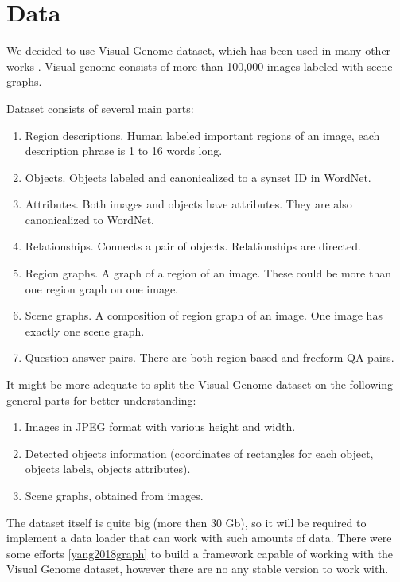 \chapter{Data}

We decided to use Visual Genome dataset, which has been used in many other works \cite{Krishna_Zhu_Groth_Johnson_Hata_Kravitz_Chen_Kalantidis_Li_Shamma_etal_2016}. Visual genome consists of more than 100,000 images labeled with scene graphs.

Dataset consists of several main parts:

\begin{enumerate}
    \item Region descriptions. Human labeled important regions of an image, each description phrase is 1 to 16 words long.
    \item Objects. Objects labeled and canonicalized to a synset ID in WordNet.
    \item Attributes. Both images and objects have attributes. They are also canonicalized to WordNet.
    \item Relationships. Connects a pair of objects. Relationships are directed.
    \item Region graphs. A graph of a region of an image. These could be more than one region graph on one image.
    \item Scene graphs. A composition of region graph of an image. One image has exactly one scene graph.
    \item Question-answer pairs. There are both region-based and freeform QA pairs.
\end{enumerate}

It might be more adequate to split the Visual Genome dataset on the following general parts for better understanding:

\begin{enumerate}
    \item Images in JPEG format with various height and width.
    \item Detected objects information (coordinates of rectangles for each object, objects labels, objects attributes).
    \item Scene graphs, obtained from images.
\end{enumerate}

The dataset itself is quite big (more then 30 Gb), so it will be required to implement a data loader that can work with such amounts of data. There were some efforts \ref{yang2018graph} to build a framework capable of working with the Visual Genome dataset, however there are no any stable version to work with.

